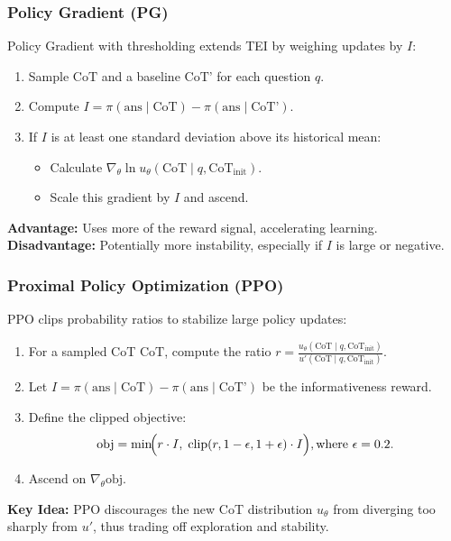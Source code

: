 \documentclass[letterpaper]{article} %
\begin{document}
\subsubsection{Policy Gradient (PG)}
\label{subsubsec:pg}
Policy Gradient with thresholding extends TEI by weighing updates by $I$:
\begin{enumerate}
    \item Sample $\text{CoT}$ and a baseline $\text{CoT'}$ for each question $q$.
    \item Compute $I = \pi(\text{ans}\mid \text{CoT}) - \pi(\text{ans}\mid \text{CoT'})$.
    \item If $I$ is at least one standard deviation above its historical mean:
\begin{itemize}
            \item Calculate $\nabla_\theta \ln u_\theta(\text{CoT} \mid q, \text{CoT}_{\text{init}})$.
            \item Scale this gradient by $I$ and ascend.
\end{itemize}
\end{enumerate}
\noindent
\textbf{Advantage:} Uses more of the reward signal, accelerating learning. \\
\textbf{Disadvantage:} Potentially more instability, especially if $I$ is large or negative.

\subsubsection{Proximal Policy Optimization (PPO)}
\label{subsubsec:ppo}
PPO clips probability ratios to stabilize large policy updates:
\begin{enumerate}
    \item For a sampled CoT $\text{CoT}$, compute the ratio $r = \frac{u_\theta(\text{CoT}\mid q,\text{CoT}_{\text{init}})}{u'(\text{CoT}\mid q,\text{CoT}_{\text{init}})}$.
    \item Let $I = \pi(\text{ans}\mid \text{CoT}) - \pi(\text{ans}\mid \text{CoT'})$ be the informativeness reward.
    \item Define the clipped objective:
    \[
    \text{obj} = \min\!\Bigl(r \cdot I, \;\text{clip}(r,1-\epsilon,1+\epsilon)\cdot I\Bigr), 
     \text{where } \epsilon=0.2.
    \]
    \item Ascend on $\nabla_\theta \text{obj}$.
\end{enumerate}
\textbf{Key Idea:} PPO discourages the new CoT distribution $u_\theta$ from diverging too sharply from $u'$, thus trading off exploration and stability.
\end{document}
